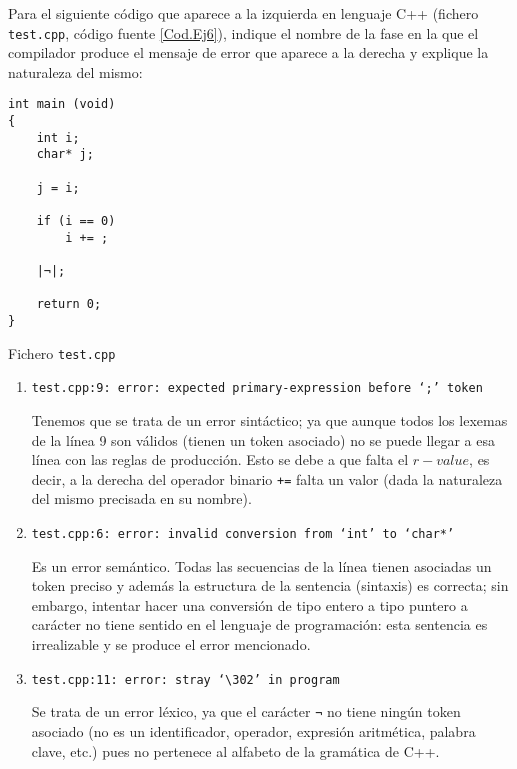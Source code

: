 \begin{ejercicio}\label{ej:3.Ejercicio6}
    Para el siguiente código que aparece a la izquierda en lenguaje C++ (fichero \verb|test.cpp|, código fuente \ref{Cod.Ej6}), indique el nombre de la fase en la que el compilador produce el mensaje de error que aparece a la derecha y explique la naturaleza del mismo:
    \begin{listing}[H]
        \begin{verbatim}
int main (void)
{
    int i;
    char* j;

    j = i;

    if (i == 0)
        i += ;
        
    |¬|;
    
    return 0;
}
        \end{verbatim}
        \caption{Fichero \texttt{test.cpp}}
        \label{Cod.Ej6}
    \end{listing}

    \begin{enumerate}
        \item \verb|test.cpp:9: error: expected primary-expression before ‘;’ token|

        Tenemos que se trata de un error sintáctico; ya que aunque todos los lexemas de la línea 9 son válidos (tienen un token asociado) no se puede llegar a esa línea con las reglas de producción. Esto se debe a que falta el $r-value$, es decir, a la derecha del operador binario \verb|+=| falta un valor (dada la naturaleza del mismo precisada en su nombre).
        
        \item \verb|test.cpp:6: error: invalid conversion from ‘int’ to ‘char*’|
        
        Es un error semántico. Todas las secuencias de la línea tienen asociadas un token preciso y además la estructura de la sentencia (sintaxis) es correcta; sin embargo, intentar hacer una conversión de tipo entero a tipo puntero a carácter no tiene sentido en el lenguaje de programación: esta sentencia es irrealizable y se produce el error mencionado.
        
        \item \verb|test.cpp:11: error: stray ‘\302’ in program|

        Se trata de un error léxico, ya que el carácter \verb|¬| no tiene ningún token asociado (no es un identificador, operador, expresión aritmética, palabra clave, etc.) pues no pertenece al alfabeto de la gramática de C++.
    \end{enumerate}
\end{ejercicio}

